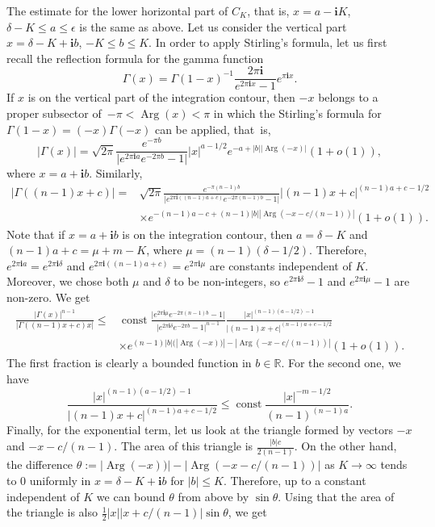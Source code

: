 \documentclass[10pt,a4paper]{article}
\numberwithin{equation}{section}
\newcommand{\RR}{\mathbb{R}}
\newcommand{\ii}{\mathbf{i}}
\begin{document}
The estimate for the lower horizontal part of $C_K$, that is, $x=a-\ii K$, $\delta-K\leq a\leq \epsilon$ is the same as above. Let us consider the vertical part $x=\delta-K+\ii b$, $-K\leq b\leq K$. In order to apply Stirling's formula, let us first recall the reflection formula for the gamma function
\[
\Gamma(x)=
\Gamma(1-x)^{-1}
\frac{2\pi \ii}{e^{2\pi\ii x} -1}
e^{\pi\ii x}.
\]
If $x$ is on the vertical part of the integration contour, then $-x$ belongs to a proper subsector of~${-\pi< \operatorname{Arg}(x)<\pi}$ in which the Stirling's formula for $\Gamma(1-x)= (-x) \Gamma(-x)$ can be applied, that~is,
\[
|\Gamma(x)|= \sqrt{2\pi}
\frac{e^{-\pi b}}{\big|e^{2\pi\ii a} e^{-2\pi b}-1\big|}
|x|^{a-1/2}
e^{-a+|b| |{\operatorname{Arg}}(-x)|}
(1+o(1)),
\]
where $x=a+\ii b$. Similarly,
\begin{align*}
|\Gamma((n-1)x+c)| ={} &
\sqrt{2\pi}
\frac{e^{-\pi (n-1) b}}{\big|e^{2\pi\ii ((n-1)a+c)} e^{-2\pi (n-1)b}-1\big|}
|(n-1)x+c|^{(n-1)a+c-1/2}\\
&
\times
e^{-(n-1)a-c+(n-1)|b| |{\operatorname{Arg}}(-x-c/(n-1))|}
(1+o(1)).
\end{align*}
Note that if $x=a+\ii b$ is on the integration contour, then $a=\delta-K$ and $(n-1)a+c= \mu +m-K$, where $\mu=(n-1)(\delta-1/2)$. Therefore, $e^{2\pi\ii a}=e^{2\pi\ii\delta}$ and
$e^{2\pi\ii ((n-1)a+c)} = e^{2\pi\ii \mu}$ are constants independent of $K$. Moreover, we chose both $\mu$ and $\delta$ to be non-integers, so $e^{2\pi\ii\delta}-1$ and $e^{2\pi\ii\mu}-1$ are non-zero.
We get
\begin{align*}
\frac{|\Gamma(x)|^{n-1}}{
|\Gamma((n-1)x+c) x| }\leq {}& \operatorname{const}
\frac{\big| e^{2\pi\ii \mu} e^{-2\pi (n-1) b}-1\big|}{
\big| e^{2\pi\ii \delta} e^{-2\pi b}-1\big|^{n-1}}
\frac{|x|^{(n-1)(a-1/2)-1}}{
|(n-1)x+c|^{(n-1)a+c-1/2}} \\
&
\times
e^{(n-1)|b|(
|{\operatorname{Arg}}(-x))|-|{\operatorname{Arg}}(-x-c/(n-1) )|}
(1+o(1)).
\end{align*}
The first fraction is clearly a bounded function in $b\in \RR$. For the second one, we have
\[
\frac{|x|^{(n-1)(a-1/2)-1}}{
|(n-1)x+c|^{(n-1)a+c-1/2}}\leq \operatorname{const}
\frac{|x|^{-m-1/2}}{
(n-1)^{(n-1)a}}.
\]
Finally, for the exponential term, let us look at the triangle formed by vectors $-x$ and $-x-c/(n-1)$. The area of this triangle is
$\frac{|b|c}{2(n-1)}$. On the other hand, the difference $\theta:=|{\operatorname{Arg}}(-x))|-|{\operatorname{Arg}}(-x-c/(n-1) )|$ as $K\rightarrow \infty$ tends to $0$ uniformly in $x=\delta-K+\ii b$ for $|b|\leq K$. Therefore, up to a constant independent of $K$ we can bound $\theta$ from above by $\sin \theta$. Using that the area of the triangle is also $\tfrac{1}{2} |x| |x+c/(n-1)| \sin\theta$, we get
\end{document}
